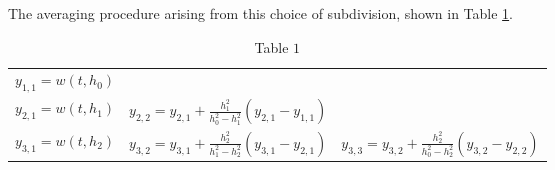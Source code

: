 The averaging procedure arising from this choice of subdivision, shown in Table \ref{tab:extrapolmethtab1}.

\begin{table}[h]
\centering
\begin{tabular}{lll}\hline
$y_{1,1}=w\left(t, h_{0}\right)$&&\\
$y_{2,1}=w\left(t, h_{1}\right)$ & $y_{2,2}=y_{2,1}+\frac{h_{1}^{2}}{h_{0}^{2}-h_{1}^{2}}\left(y_{2,1}-y_{1,1}\right)$&\\
$y_{3,1}=w\left(t, h_{2}\right)$ & $y_{3,2}=y_{3,1}+\frac{h_{2}^{2}}{h_{1}^{2}-h_{2}^{2}}\left(y_{3,1}-y_{2,1}\right)$ & $y_{3,3}=y_{3,2}+\frac{h_{2}^{2}}{h_{0}^{2}-h_{2}^{2}}\left(y_{3,2}-y_{2,2}\right)$\\\hline
\end{tabular}
\caption{\scriptsize Table $1$}
\label{tab:extrapolmethtab1}
\end{table}

